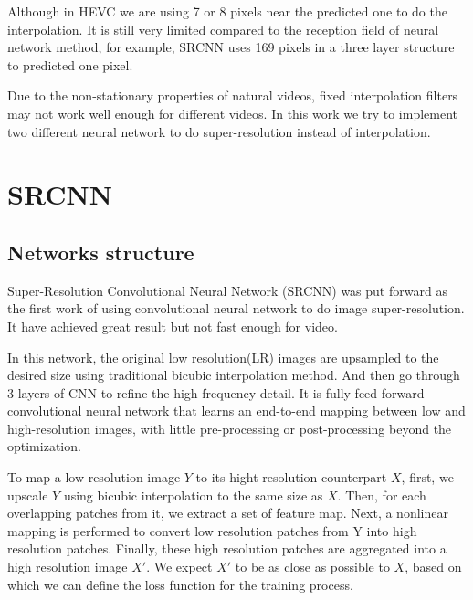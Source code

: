 \documentclass[12pt,journal,compsoc]{IEEEtran}
\begin{document}
 Although in HEVC we are using 7 or 8 pixels near the predicted one to do the interpolation. It is still very limited compared to the reception field of neural network method, for example, SRCNN uses 169 pixels in a three layer structure to predicted one pixel.

Due to the non-stationary properties of natural videos, fixed interpolation filters may not work well enough for different videos. In this work we try to implement two different neural network to do super-resolution instead of interpolation.

\section{SRCNN}
\subsection{Networks structure}
Super-Resolution Convolutional Neural Network (SRCNN)\cite{DBLP:journals/corr/DongLHT15} was put forward as the first work of using convolutional neural network to do image super-resolution. It have achieved great result but not fast enough for video. 

In this network, the original low resolution(LR) images are upsampled to the desired size using traditional bicubic interpolation method. And then go through 3 layers of CNN to refine the high frequency detail. It is fully feed-forward convolutional neural network that learns an end-to-end mapping between low and high-resolution images, with little pre-processing or post-processing beyond the optimization.

To map a low resolution image $Y$ to its hight resolution counterpart $X$, first, we upscale $Y$ using bicubic interpolation to the same size as $X$. Then, for each  overlapping patches from it, we extract a set of feature map. Next, a nonlinear mapping is performed to convert low resolution patches from Y into high resolution patches. Finally, these high resolution patches are aggregated into a high resolution image $X'$. We expect $X'$ to be as close as possible to $X$, based on which we can define the loss function for the training process.
\end{document}
